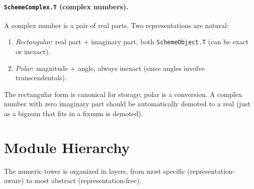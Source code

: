 \documentclass[12pt]{article}
\begin{document}
\paragraph{{\tt SchemeComplex.T} (complex numbers).}
A complex number is a pair of real parts.  Two representations
are natural:
\begin{enumerate}[nosep]
\item \emph{Rectangular}: real part + imaginary part, both
  {\tt SchemeObject.T} (can be exact or inexact).
\item \emph{Polar}: magnitude + angle, always inexact (since
  angles involve transcendentals).
\end{enumerate}
The rectangular form is canonical for storage; polar is a
conversion.  A complex number with zero imaginary part should
be automatically demoted to a real (just as a bignum that fits
in a fixnum is demoted).

\section{Module Hierarchy}
\label{sec:hierarchy}

The numeric tower is organized in layers, from most specific
(representation-aware) to most abstract (representation-free).
\end{document}
